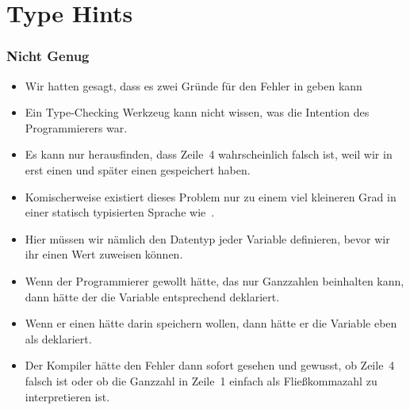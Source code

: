 \documentclass[aspectratio=169,mathserif,notheorems]{beamer}%
\begin{document}
\section{Type Hints}%
%
\begin{frame}%
\frametitle{Nicht Genug}%
\begin{itemize}%
\item Wir hatten gesagt, dass es zwei Gründe für den Fehler in  geben kann%
%
\item<4-> Ein Type-Checking Werkzeug kann nicht wissen, was die Intention des Programmierers war.%
\item<5-> Es kann nur herausfinden, dass Zeile~4 wahrscheinlich falsch ist, weil wir in  erst einen  und später einen  gespeichert haben.%
%
\item<7-> Komischerweise existiert dieses Problem nur zu einem viel kleineren Grad in einer statisch typisierten Sprache wie~.%
\item<8-> Hier müssen wir nämlich den Datentyp jeder Variable definieren, bevor wir ihr einen Wert zuweisen können.%
\item<9-> Wenn der Programmierer gewollt hätte, das  nur Ganzzahlen beinhalten kann, dann hätte der die Variable entsprechend deklariert.%
\item<10-> Wenn er einen  hätte darin speichern wollen, dann hätte er die Variable eben als  deklariert.%
\item<11-> Der Kompiler hätte den Fehler dann sofort gesehen und gewusst, ob Zeile~4 falsch ist oder ob die Ganzzahl in Zeile~1 einfach als Fließkommazahl zu interpretieren ist.%
\end{itemize}%
%
\end{frame}%
%
\end{document}
